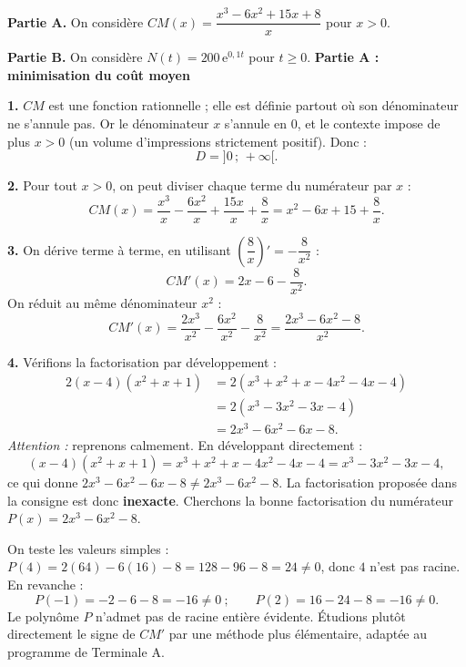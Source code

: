 \documentclass[11pt]{article}
\begin{document}
\begin{exoresolu}
\textbf{Partie A.} On considère $CM(x) = \dfrac{x^3 - 6x^2 + 15x + 8}{x}$ pour $x > 0$.

\textbf{Partie B.} On considère $N(t) = 200\,\mathrm{e}^{0{,}1t}$ pour $t \geq 0$.
\tcblower
\textbf{Partie A : minimisation du coût moyen}

\textbf{1.} $CM$ est une fonction rationnelle ; elle est définie partout où son dénominateur ne s'annule pas. Or le dénominateur $x$ s'annule en $0$, et le contexte impose de plus $x > 0$ (un volume d'impressions strictement positif). Donc :
\[ D = ]0\,;\,+\infty[. \]

\textbf{2.} Pour tout $x > 0$, on peut diviser chaque terme du numérateur par $x$ :
\[ CM(x) = \dfrac{x^3}{x} - \dfrac{6x^2}{x} + \dfrac{15x}{x} + \dfrac{8}{x} = x^2 - 6x + 15 + \dfrac{8}{x}. \]

\textbf{3.} On dérive terme à terme, en utilisant $\left(\dfrac{8}{x}\right)' = -\dfrac{8}{x^2}$ :
\[ CM'(x) = 2x - 6 - \dfrac{8}{x^2}. \]
On réduit au même dénominateur $x^2$ :
\[ CM'(x) = \dfrac{2x^3}{x^2} - \dfrac{6x^2}{x^2} - \dfrac{8}{x^2} = \dfrac{2x^3 - 6x^2 - 8}{x^2}. \]

\textbf{4.} Vérifions la factorisation par développement :
\begin{align*}
2(x-4)(x^2+x+1) &= 2\left(x^3 + x^2 + x - 4x^2 - 4x - 4\right) \\
&= 2\left(x^3 - 3x^2 - 3x - 4\right) \\
&= 2x^3 - 6x^2 - 6x - 8.
\end{align*}
\emph{Attention :} reprenons calmement. En développant directement :
\[ (x-4)(x^2+x+1) = x^3 + x^2 + x - 4x^2 - 4x - 4 = x^3 - 3x^2 - 3x - 4, \]
ce qui donne $2x^3 - 6x^2 - 6x - 8 \neq 2x^3 - 6x^2 - 8$. La factorisation proposée dans la consigne est donc \textbf{inexacte}. Cherchons la bonne factorisation du numérateur $P(x) = 2x^3 - 6x^2 - 8$.

On teste les valeurs simples : $P(4) = 2(64) - 6(16) - 8 = 128 - 96 - 8 = 24 \neq 0$, donc $4$ n'est pas racine. En revanche :
\[ P(-1) = -2 - 6 - 8 = -16 \neq 0 \ ; \qquad P(2) = 16 - 24 - 8 = -16 \neq 0. \]
Le polynôme $P$ n'admet pas de racine entière évidente. Étudions plutôt directement le signe de $CM'$ par une méthode plus élémentaire, adaptée au programme de Terminale A.


\end{exoresolu}
\end{document}
